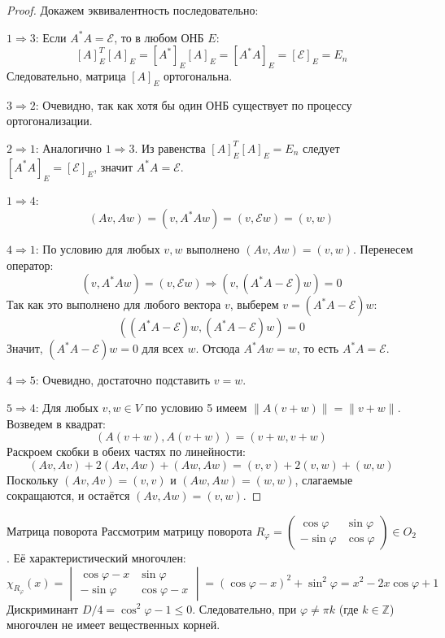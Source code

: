 \begin{proof}
	Докажем эквивалентность последовательно:

	\textbf{$1 \Rightarrow 3$}:
	Если $A^* A = \mathcal{E}$, то в любом ОНБ $E$:
	\[
	[A]_E^T [A]_E = [A^*]_E [A]_E = [A^* A]_E = [\mathcal{E}]_E = E_n
	\] 
	Следовательно, матрица $[A]_E$ ортогональна.

	\textbf{$3 \Rightarrow 2$}:
	Очевидно, так как хотя бы один ОНБ существует по процессу ортогонализации.

	\textbf{$2 \Rightarrow 1$}:
	Аналогично $1 \Rightarrow 3$.
	Из равенства $[A]_E^T [A]_E = E_n$ следует $[A^* A]_E = [\mathcal{E}]_E$, значит $A^* A = \mathcal{E}$.

	\textbf{$1 \Rightarrow 4$}:
	\[
	(Av, Aw) = (v, A^* A w) = (v, \mathcal{E} w) = (v, w)
	\] 

	\textbf{$4 \Rightarrow 1$}:
	По условию для любых $v, w$ выполнено $(Av, Aw) = (v, w)$.
	Перенесем оператор:
	\[
	(v, A^* A w) = (v, \mathcal{E} w) \Rightarrow (v, (A^* A - \mathcal{E}) w) = 0
	\] 
	Так как это выполнено для любого вектора $v$, выберем $v = (A^* A - \mathcal{E}) w$:
	\[
	((A^* A - \mathcal{E}) w, (A^* A - \mathcal{E}) w) = 0
	\] 
	Значит, $(A^* A - \mathcal{E}) w = 0$ для всех $w$.
	Отсюда $A^* A w = w$, то есть $A^* A = \mathcal{E}$.

	\textbf{$4 \Rightarrow 5$}:
	Очевидно, достаточно подставить $v = w$.

	\textbf{$5 \Rightarrow 4$}:
	Для любых $v, w \in V$ по условию 5 имеем $\|A(v+w)\| = \|v+w\|$.
	Возведем в квадрат:
	\[
	(A(v+w), A(v+w)) = (v+w, v+w)
	\] 
	Раскроем скобки в обеих частях по линейности:
	\[
	(Av, Av) + 2(Av, Aw) + (Aw, Aw) = (v, v) + 2(v, w) + (w, w)
	\] 
	Поскольку $(Av, Av) = (v, v)$ и $(Aw, Aw) = (w, w)$, слагаемые сокращаются, и остаётся $(Av, Aw) = (v, w)$.
\end{proof}

\begin{Example}{Матрица поворота}{}
	Рассмотрим матрицу поворота $R_\varphi = \begin{pmatrix} \cos\varphi & \sin\varphi \\ -\sin\varphi & \cos\varphi \end{pmatrix} \in O_2$.
	Её характеристический многочлен:
	\[
	\chi_{R_\varphi}(x) = \begin{vmatrix} \cos\varphi - x & \sin\varphi \\ -\sin\varphi & \cos\varphi - x \end{vmatrix} = (\cos\varphi - x)^2 + \sin^2\varphi = x^2 - 2x\cos\varphi + 1
	\] 
	Дискриминант $D/4 = \cos^2\varphi - 1 \le 0$.
	Следовательно, при $\varphi \neq \pi k$ (где $k \in \mathbb{Z}$) многочлен не имеет вещественных корней.
\end{Example}

